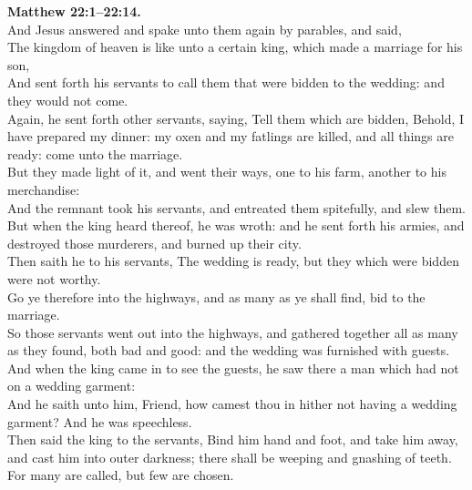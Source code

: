 \documentclass[10pt]{article} %
\begin{document}
{\begin{minipage}[t]{0.45\textwidth}
\textbf{Matthew 22:1--22:14.}\\
And Jesus answered and spake unto them again by parables, and said,\\
The kingdom of heaven is like unto a certain king, which made a marriage for his son,\\
And sent forth his servants to call them that were bidden to the wedding: and they would not come.\\
Again, he sent forth other servants, saying, Tell them which are bidden, Behold, I have prepared my dinner: my oxen and my fatlings are killed, and all things are ready: come unto the marriage.\\
But they made light of it, and went their ways, one to his farm, another to his merchandise:\\
And the remnant took his servants, and entreated them spitefully, and slew them.\\
But when the king heard thereof, he was wroth: and he sent forth his armies, and destroyed those murderers, and burned up their city.\\
Then saith he to his servants, The wedding is ready, but they which were bidden were not worthy.\\
Go ye therefore into the highways, and as many as ye shall find, bid to the marriage.\\
So those servants went out into the highways, and gathered together all as many as they found, both bad and good: and the wedding was furnished with guests.\\
And when the king came in to see the guests, he saw there a man which had not on a wedding garment:\\
And he saith unto him, Friend, how camest thou in hither not having a wedding garment? And he was speechless.\\
Then said the king to the servants, Bind him hand and foot, and take him away, and cast him into outer darkness; there shall be weeping and gnashing of teeth.\\
For many are called, but few are chosen.\\

\end{minipage}}
\vspace*{\fill}
\newpage
\huge%
\vspace*{\fill}
\end{document}
